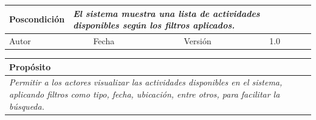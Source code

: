 \begin{table}[H]
\begin{tabular}{llllllll}
        \multicolumn{1}{|l|}{Poscondición}                           & \multicolumn{7}{p{10cm}|}{{\color[HTML]{808080} \textit{El sistema muestra una lista de actividades disponibles según los filtros aplicados.}}}                                                                                                                                                                                                                                                       \\ \hline
        \multicolumn{1}{|l|}{Autor}                                  & \multicolumn{1}{l|}{{\color[HTML]{808080} \textit{}}}                           & \multicolumn{2}{l|}{Fecha}                                                   & \multicolumn{1}{l|}{}                          & \multicolumn{2}{l|}{Versión}                                                      & \multicolumn{1}{l|}{1.0}                                                     \\ \hline
        \end{tabular}
    \end{table}

    \begin{table}[H]
        \begin{tabular}{llllllll}
        \hline
        \multicolumn{8}{|l|}{\cellcolor[HTML]{F2F2F2}Propósito}                                                                                                                                                                                                                                                                                                                                                                                           \\ \hline
        \multicolumn{8}{|p{15cm}|}{{\color[HTML]{808080} \textit{Permitir a los actores visualizar las actividades disponibles en el sistema, aplicando filtros como tipo, fecha, ubicación, entre otros, para facilitar la búsqueda.}}}                                                                                                                                                                                                             \\ \hline
        \end{tabular}
    \end{table}

